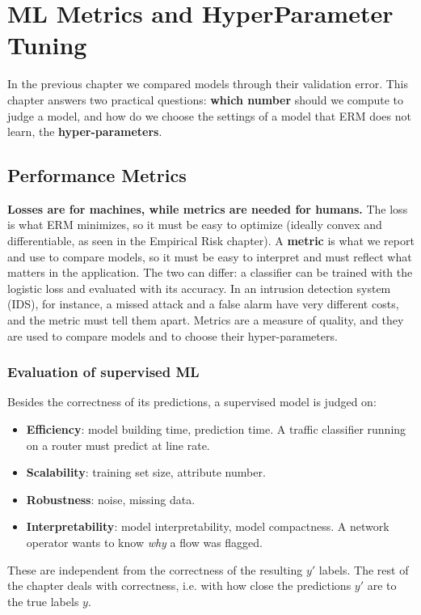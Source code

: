\chapter{ML Metrics and HyperParameter Tuning}

In the previous chapter we compared models through their validation error. This chapter answers two practical questions: \textbf{which number} should we compute to judge a model, and how do we choose the settings of a model that ERM does not learn, the \textbf{hyper-parameters}.

\section{Performance Metrics}

\textbf{Losses are for machines, while metrics are needed for humans.} The loss is what ERM minimizes, so it must be easy to optimize (ideally convex and differentiable, as seen in the Empirical Risk chapter). A \textbf{metric} is what we report and use to compare models, so it must be easy to interpret and must reflect what matters in the application. The two can differ: a classifier can be trained with the logistic loss and evaluated with its accuracy. In an intrusion detection system (IDS), for instance, a missed attack and a false alarm have very different costs, and the metric must tell them apart. Metrics are a measure of quality, and they are used to compare models and to choose their hyper-parameters.

\subsection{Evaluation of supervised ML}
Besides the correctness of its predictions, a supervised model is judged on:
\begin{itemize}
    \item \textbf{Efficiency}: model building time, prediction time. A traffic classifier running on a router must predict at line rate.
    \item \textbf{Scalability}: training set size, attribute number.
    \item \textbf{Robustness}: noise, missing data.
    \item \textbf{Interpretability}: model interpretability, model compactness. A network operator wants to know \emph{why} a flow was flagged.
\end{itemize}
These are independent from the correctness of the resulting $y'$ labels. The rest of the chapter deals with correctness, i.e. with how close the predictions $y'$ are to the true labels $y$.

